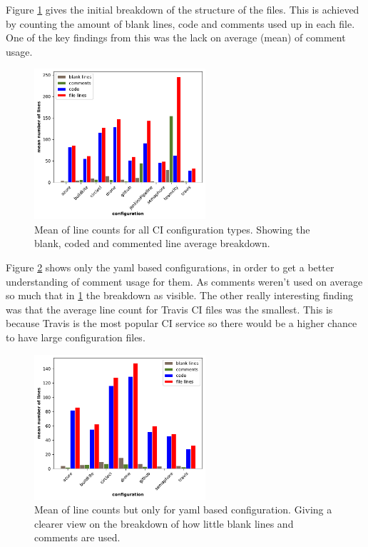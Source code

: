 \documentclass[10pt,conference]{IEEEtran}
\begin{document}



Figure \ref{fig:lines_structure_all} gives the initial breakdown of the structure of the files. This is achieved by counting the amount of blank lines, code and comments used up in each file. One of the key findings from this was the lack on average (mean) of comment usage. 

\begin{figure}[!ht]
  \centering
  \includegraphics[width=2.5in]{../src/results/line structure all.pdf}
  \caption[alt text]{Mean of line counts for all CI configuration types. Showing the blank, coded and commented line average breakdown.}
  \label{fig:lines_structure_all}
\end{figure}

Figure \ref{fig:lines_structure_yaml} shows only the yaml based configurations, in order to get a better understanding of comment usage for them. As comments weren't used on average so much that in \ref{fig:lines_structure_all} the breakdown as visible. The other really interesting finding was that the average line count for Travis CI files was the smallest. This is because Travis is the most popular CI service so there would be a higher chance to have large configuration files. 


\begin{figure}[!ht]
  \centering
  \includegraphics[width=2.5in]{../src/results/line structure yaml.pdf}
  \caption[alt text]{Mean of line counts but only for yaml based configuration. Giving a clearer view on the breakdown of how little blank lines and comments are used.}
  \label{fig:lines_structure_yaml}
\end{figure}
\end{document}
